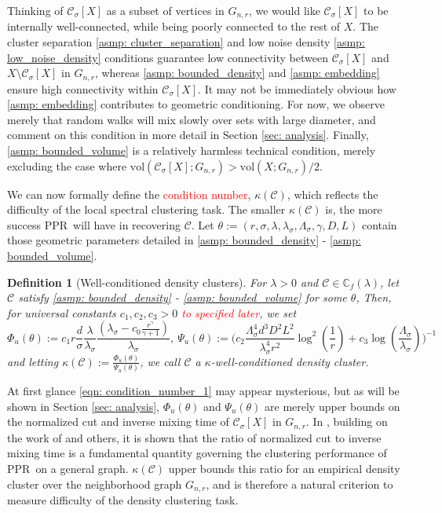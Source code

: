 \documentclass{article}
\newcommand{\vol}{\mathrm{vol}}
\newcommand{\1}{\mathbf{1}}
\newcommand{\Phibf}{\Phi_{u}}
\newcommand{\Psibf}{\Psi_{u}}
\newcommand{\Xbf}{X}             %
\newcommand{\Cbb}{\mathbb{C}}
\newcommand{\Cset}{\mathcal{C}}
\newcommand{\Csig}{\Cset_{\sigma}}
\newcommand{\pprspace}{{\sc PPR~}}
\theoremstyle{aldenthm}
\newtheorem{definition}{Definition}
\theoremstyle{aldenrmrk}
\begin{document}
Thinking of $\Csig[\Xbf]$ as a subset of vertices in $G_{n,r}$, we would like $\Csig[\Xbf]$ to be internally well-connected, while being poorly connected to the rest of $\Xbf$. The cluster separation \ref{asmp: cluster_separation} and low noise density \ref{asmp: low_noise_density} conditions guarantee low connectivity between $\Csig[\Xbf]$ and $\Xbf \setminus \Csig[\Xbf]$ in $G_{n,r}$, whereas \ref{asmp: bounded_density} and \ref{asmp: embedding} ensure high connectivity within $\Csig[\Xbf]$. It may not be immediately obvious how \ref{asmp: embedding} contributes to geometric conditioning. For now, we observe merely that random walks will mix slowly over sets with large diameter, and comment on this condition in more detail in Section \ref{sec: analysis}. Finally, \ref{asmp: bounded_volume} is a relatively harmless technical condition, merely excluding the case where $\vol(\Csig[\Xbf]; G_{n,r}) > \vol(\Xbf; G_{n,r})/2$. 

We can now formally define the \textcolor{red}{condition number}, $\kappa(\Cset)$, which reflects the difficulty of the local spectral clustering task. The smaller $\kappa(\Cset)$ is, the more success \pprspace will have in recovering $\Cset$. Let $\theta := (r, \sigma, \lambda, \lambda_{\sigma}, \Lambda_{\sigma}, \gamma, D, L)$ contain those geometric parameters detailed in \ref{asmp: bounded_density} - \ref{asmp: bounded_volume}.

\begin{definition}[Well-conditioned density clusters]
	For $\lambda > 0$ and $\Cset \in \Cbb_f(\lambda)$, let $\Cset$ satisfy \ref{asmp: bounded_density} - \ref{asmp: bounded_volume} for some $\theta$, Then, for universal constants $c_1, c_2, c_3 > 0$ \textcolor{red}{to specified later}, we set
	\begin{equation}
	\label{eqn: condition_number_1}
	\Phibf(\theta) 
	:= c_1 r \frac{d}{\sigma} \frac{\lambda}{\lambda_{\sigma}} \frac{(\lambda_{\sigma} - c_0 \frac{r^{\gamma}}{\gamma + 1})}{\lambda_{\sigma}},~ 
	\Psibf(\theta) := \Biggl(c_2 \frac{\Lambda_{\sigma}^4 d^3 D^2 L^2}{\lambda_{\sigma}^4 r^2} \log^2\left(\frac{1}{r}\right) + c_3 \log\left(\frac{\Lambda_{\sigma}}{\lambda_{\sigma}}\right) \Biggr)^{-1}
	\end{equation}
	and letting $\kappa(\Cset) := \frac{\Phibf(\theta)}{\Psibf(\theta)}$, we call $\Cset$ a \textrm{$\kappa$-well-conditioned density cluster}.
\end{definition}

At first glance \eqref{eqn: condition_number_1} may appear mysterious, but as will be shown in Section \ref{sec: analysis}, $\Phibf(\theta)$ and $\Psibf(\theta)$ are merely upper bounds on the normalized cut and inverse mixing time of $\Csig[\Xbf]$ in $G_{n,r}$. In \cite{zhu2013}, building on the work of \cite{andersen2006} and others, it is shown that the ratio of normalized cut to inverse mixing time is a fundamental quantity governing the clustering performance of \pprspace on a general graph. $\kappa(\Cset)$ upper bounds this ratio for an empirical density cluster over the neighborhood graph $G_{n,r}$, and is therefore a natural criterion to measure difficulty of the density clustering task.
\end{document}
